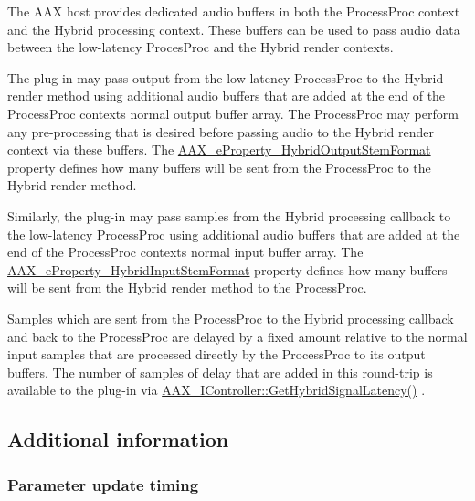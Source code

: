 The A\+A\+X host provides dedicated audio buffers in both the Process\+Proc context and the Hybrid processing context. These buffers can be used to pass audio data between the low-\/latency Proces\+Proc and the Hybrid render contexts. \begin{DoxyItemize}
\item The plug-\/in may pass output from the low-\/latency Process\+Proc to the Hybrid render method using additional audio buffers that are added at the end of the Process\+Proc context\textquotesingle{}s normal output buffer array. The Process\+Proc may perform any pre-\/processing that is desired before passing audio to the Hybrid render context via these buffers. The \hyperlink{a00335_ga6571f4e41a5dd06e4067249228e2249eac30a4e73772e37267dfef39ae3122705}{A\+A\+X\+\_\+e\+Property\+\_\+\+Hybrid\+Output\+Stem\+Format} property defines how many buffers will be sent from the Process\+Proc to the Hybrid render method. \item Similarly, the plug-\/in may pass samples from the Hybrid processing callback to the low-\/latency Process\+Proc using additional audio buffers that are added at the end of the Process\+Proc context\textquotesingle{}s normal input buffer array. The \hyperlink{a00335_ga6571f4e41a5dd06e4067249228e2249ea33a950bc2e02d38fc3be0a0ad8cc89b1}{A\+A\+X\+\_\+e\+Property\+\_\+\+Hybrid\+Input\+Stem\+Format} property defines how many buffers will be sent from the Hybrid render method to the Process\+Proc.\end{DoxyItemize}
Samples which are sent from the Process\+Proc to the Hybrid processing callback and back to the Process\+Proc are delayed by a fixed amount relative to the normal input samples that are processed directly by the Process\+Proc to its output buffers. The number of samples of delay that are added in this round-\/trip is available to the plug-\/in via \hyperlink{a00335_ga47b471c438fcad0798964b860d74609e}{A\+A\+X\+\_\+\+I\+Controller\+::\+Get\+Hybrid\+Signal\+Latency()} .\hypertarget{a00335_additionalFeatures_Hybrid_subtleties}{}\subsection{Additional information}\label{a00335_additionalFeatures_Hybrid_subtleties}
\hypertarget{a00335_additionalFeatures_Hybrid_parametertiming}{}\subsubsection{Parameter update timing}\label{a00335_additionalFeatures_Hybrid_parametertiming}
